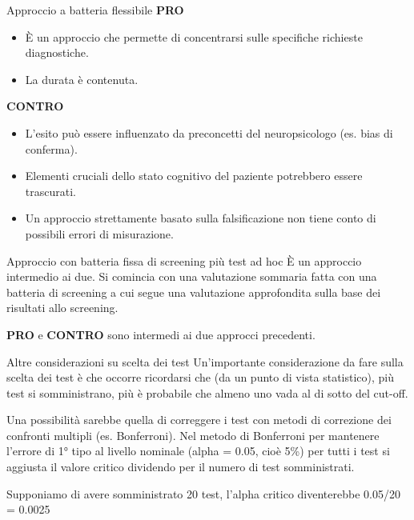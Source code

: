 \documentclass[
  ignorenonframetext,
]{beamer}
\providecommand{\tightlist}{%
  \setlength{\itemsep}{0pt}\setlength{\parskip}{0pt}}
\begin{document}
\begin{frame}{Approccio a batteria flessibile}
\label{approccio-a-batteria-flessibile-2}
\textbf{PRO}

\begin{itemize}
\tightlist
\item
  È un approccio che permette di concentrarsi sulle specifiche richieste
  diagnostiche.
\item
  La durata è contenuta.
\end{itemize}

\textbf{CONTRO}

\begin{itemize}
\tightlist
\item
  L'esito può essere influenzato da preconcetti del neuropsicologo (es.
  bias di conferma).
\item
  Elementi cruciali dello stato cognitivo del paziente potrebbero essere
  trascurati.
\item
  Un approccio strettamente basato sulla falsificazione non tiene conto
  di possibili errori di misurazione.
\end{itemize}
\end{frame}

\begin{frame}{Approccio con batteria fissa di screening più test ad hoc}
\label{approccio-con-batteria-fissa-di-screening-piuxf9-test-ad-hoc}
È un approccio intermedio ai due. Si comincia con una valutazione
sommaria fatta con una batteria di screening a cui segue una valutazione
approfondita sulla base dei risultati allo screening.

\textbf{PRO} e \textbf{CONTRO} sono intermedi ai due approcci
precedenti.
\end{frame}

\begin{frame}{Altre considerazioni su scelta dei test}
\label{altre-considerazioni-su-scelta-dei-test}
Un'importante considerazione da fare sulla scelta dei test è che occorre
ricordarsi che (da un punto di vista statistico), più test si
somministrano, più è probabile che almeno uno vada al di sotto del
cut-off.

Una possibilità sarebbe quella di correggere i test con metodi di
correzione dei confronti multipli (es. Bonferroni). Nel metodo di
Bonferroni per mantenere l'errore di 1° tipo al livello nominale (alpha
= 0.05, cioè 5\%) per tutti i test si aggiusta il valore critico
dividendo per il numero di test somministrati.

Supponiamo di avere somministrato 20 test, l'alpha critico diventerebbe
0.05/20 = 0.0025
\end{frame}
\end{document}
